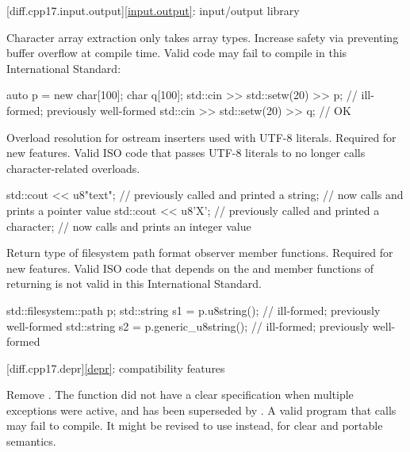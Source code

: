 [diff.cpp17.input.output]{\ref{input.output}: input/output library}

\change
Character array extraction only takes array types.
\rationale Increase safety via preventing buffer overflow at compile time.
\effect
Valid \CppXVII{} code may fail to compile in this International Standard:
\begin{codeblock}
auto p = new char[100];
char q[100];
std::cin >> std::setw(20) >> p;        // ill-formed; previously well-formed
std::cin >> std::setw(20) >> q;        // OK
\end{codeblock}

\change
Overload resolution for ostream inserters used with UTF-8 literals.
\rationale
Required for new features.
\effect
Valid ISO \CppXVII{} code that passes UTF-8 literals
to 
no longer calls character-related overloads.
\begin{codeblock}
std::cout << u8"text";          // previously called  and printed a string;
                                // now calls  and prints a pointer value
std::cout << u8'X';             // previously called  and printed a character;
                                // now calls  and prints an integer value
\end{codeblock}

\change
Return type of filesystem path format observer member functions.
\rationale
Required for new features.
\effect
Valid ISO \CppXVII{} code that depends on the  and
 member functions of 
returning  is not valid in this International Standard.
\begin{codeblock}
std::filesystem::path p;
std::string s1 = p.u8string();          // ill-formed; previously well-formed
std::string s2 = p.generic_u8string();  // ill-formed; previously well-formed
\end{codeblock}

[diff.cpp17.depr]{\ref{depr}: compatibility features}

\nodiffref
\change Remove .
\rationale
The function did not have a clear specification when multiple exceptions were
active, and has been superseded by .
\effect
A valid \CppXVII{} program that calls  may fail
to compile. It might be revised to use  instead,
for clear and portable semantics.

